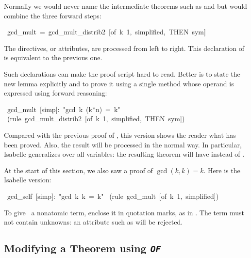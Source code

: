 %
Normally we would never name the intermediate theorems
such as  and  but would combine
the three forward steps: 
\begin{isabelle}
\ gcd_mult\ =\ gcd_mult_distrib2\ [of\ k\ 1,\ simplified,\ THEN\ sym]%
\end{isabelle}
The directives, or attributes, are processed from left to right.  This
declaration of  is equivalent to the
previous one.

Such declarations can make the proof script hard to read.  Better   
is to state the new lemma explicitly and to prove it using a single
 method whose operand is expressed using forward reasoning:
\begin{isabelle}
\ gcd\_mult\ [simp]:\ "gcd\ k\ (k*n)\ =\ k"\isanewline
{}\ (rule\ gcd_mult_distrib2\ [of\ k\ 1,\ simplified,\ THEN\ sym])
\end{isabelle}
Compared with the previous proof of , this
version shows the reader what has been proved.  Also, the result will be processed
in the normal way.  In particular, Isabelle generalizes over all variables: the
resulting theorem will have {} instead of {}.

At the start  of this section, we also saw a proof of $\gcd(k,k)=k$.  Here
is the Isabelle version:
\begin{isabelle}
\ gcd\_self\ [simp]:\ "gcd\ k\ k\ =\ k"\isanewline
{}\ (rule\ gcd_mult\ [of\ k\ 1,\ simplified])
\end{isabelle}

\begin{warn}
To give~ a nonatomic term, enclose it in quotation marks, as in
\isa{[of "k*m"]}.  The term must not contain unknowns: an
attribute such as 
\isa{[of "?k*m"]} will be rejected.
\end{warn}


\subsection{Modifying a Theorem using {\tt\slshape OF}}

